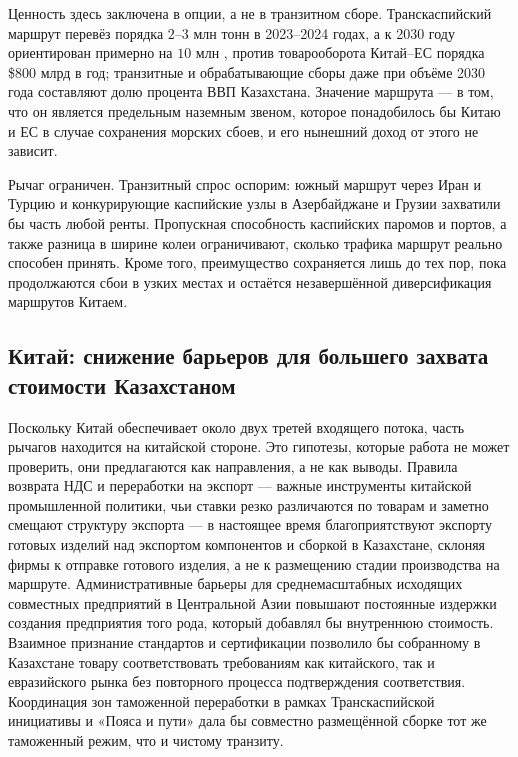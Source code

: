 \documentclass[12pt]{article}
\begin{document}
Ценность здесь заключена в опции, а не в транзитном сборе. Транскаспийский маршрут перевёз
порядка $2$--$3$ млн тонн в 2023--2024 годах, а к 2030 году ориентирован примерно на
$10$ млн \citep{worldbank2023middlecorridor}, против товарооборота Китай--ЕС порядка
\$800 млрд в год; транзитные и обрабатывающие сборы даже при объёме 2030 года составляют
долю процента ВВП Казахстана. Значение маршрута — в том, что он является предельным
наземным звеном, которое понадобилось бы Китаю и ЕС в случае сохранения морских сбоев, и
его нынешний доход от этого не зависит.

Рычаг ограничен. Транзитный спрос оспорим: южный маршрут через Иран и Турцию и конкурирующие
каспийские узлы в Азербайджане и Грузии захватили бы часть любой ренты. Пропускная
способность каспийских паромов и портов, а также разница в ширине колеи ограничивают, сколько
трафика маршрут реально способен принять. Кроме того, преимущество сохраняется лишь до тех
пор, пока продолжаются сбои в узких местах и остаётся незавершённой диверсификация
маршрутов Китаем.

\subsection{Китай: снижение барьеров для большего захвата стоимости Казахстаном}

Поскольку Китай обеспечивает около двух третей входящего потока, часть рычагов находится на
китайской стороне. Это гипотезы, которые работа не может проверить, они предлагаются как
направления, а не как выводы. Правила возврата НДС и переработки на экспорт — важные
инструменты китайской промышленной политики, чьи ставки резко различаются по товарам и
заметно смещают структуру экспорта \citep{gourdon2022vat} — в настоящее время благоприятствуют
экспорту готовых изделий над экспортом компонентов и сборкой в Казахстане, склоняя фирмы к
отправке готового изделия, а не к размещению стадии производства на маршруте.
Административные барьеры для среднемасштабных исходящих совместных предприятий в
Центральной Азии повышают постоянные издержки создания предприятия того рода, который
добавлял бы внутреннюю стоимость. Взаимное признание стандартов и сертификации позволило бы
собранному в Казахстане товару соответствовать требованиям как китайского, так и
евразийского рынка без повторного процесса подтверждения соответствия. Координация зон
таможенной переработки в рамках Транскаспийской инициативы и «Пояса и пути» дала бы
совместно размещённой сборке тот же таможенный режим, что и чистому транзиту.
\end{document}
